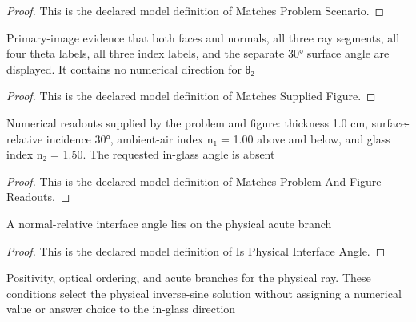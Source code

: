 \begin{proof}
  This is the declared model definition of Matches Problem Scenario.
\end{proof}
\begin{definition}
  \label{def:physics:phyx-mini-0155:phyxminiproblems-problemphyxmini0155-matchessuppliedfigure}
  Primary-image evidence that both faces and normals, all three ray segments, all four theta labels, all three index labels, and the separate 30° surface angle are displayed. It contains no numerical direction for θ₂
\end{definition}
\begin{proof}
  This is the declared model definition of Matches Supplied Figure.
\end{proof}
\begin{definition}
  \label{def:physics:phyx-mini-0155:phyxminiproblems-problemphyxmini0155-matchesproblemandfigurereadouts}
  Numerical readouts supplied by the problem and figure: thickness 1.0 cm, surface-relative incidence 30°, ambient-air index n₁ = 1.00 above and below, and glass index n₂ = 1.50. The requested in-glass angle is absent
\end{definition}
\begin{proof}
  This is the declared model definition of Matches Problem And Figure Readouts.
\end{proof}
\begin{definition}
  \label{def:physics:phyx-mini-0155:phyxminiproblems-problemphyxmini0155-isphysicalinterfaceangle}
  A normal-relative interface angle lies on the physical acute branch
\end{definition}
\begin{proof}
  This is the declared model definition of Is Physical Interface Angle.
\end{proof}
\begin{definition}
  \label{def:physics:phyx-mini-0155:phyxminiproblems-problemphyxmini0155-hasphysicalopticalparameters}
  Positivity, optical ordering, and acute branches for the physical ray. These conditions select the physical inverse-sine solution without assigning a numerical value or answer choice to the in-glass direction
\end{definition}
